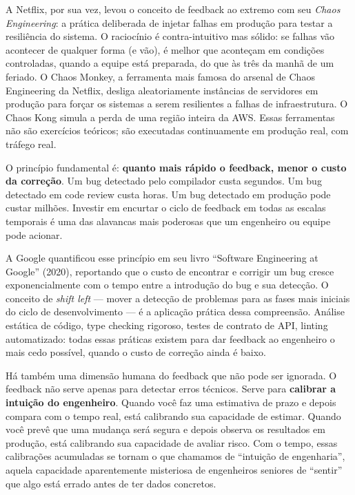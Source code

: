A Netflix, por sua vez, levou o conceito de feedback ao extremo com seu
\emph{Chaos Engineering}: a prática deliberada de injetar falhas em
produção para testar a resiliência do sistema. O raciocínio é
contra-intuitivo mas sólido: se falhas vão acontecer de qualquer forma
(e vão), é melhor que aconteçam em condições controladas, quando a equipe
está preparada, do que às três da manhã de um feriado. O Chaos Monkey, a
ferramenta mais famosa do arsenal de Chaos Engineering da Netflix, desliga
aleatoriamente instâncias de servidores em produção para forçar os
sistemas a serem resilientes a falhas de infraestrutura. O Chaos Kong
simula a perda de uma região inteira da AWS. Essas ferramentas não são
exercícios teóricos; são executadas continuamente em produção real,
com tráfego real.

O princípio fundamental é: \textbf{quanto mais rápido o feedback, menor
o custo da correção}. Um bug detectado pelo compilador custa segundos.
Um bug detectado em code review custa horas. Um bug detectado em produção
pode custar milhões. Investir em encurtar o ciclo de feedback em todas as
escalas temporais é uma das alavancas mais poderosas que um engenheiro
ou equipe pode acionar.

A Google quantificou esse princípio em seu livro ``Software Engineering
at Google'' (2020), reportando que o custo de encontrar e corrigir um
bug cresce exponencialmente com o tempo entre a introdução do bug e sua
detecção. O conceito de \emph{shift left} --- mover a detecção de
problemas para as fases mais iniciais do ciclo de desenvolvimento --- é
a aplicação prática dessa compreensão. Análise estática de código, type
checking rigoroso, testes de contrato de API, linting automatizado:
todas essas práticas existem para dar feedback ao engenheiro o mais cedo
possível, quando o custo de correção ainda é baixo.

Há também uma dimensão humana do feedback que não pode ser ignorada. O
feedback não serve apenas para detectar erros técnicos. Serve para
\textbf{calibrar a intuição do engenheiro}. Quando você faz uma
estimativa de prazo e depois compara com o tempo real, está calibrando
sua capacidade de estimar. Quando você prevê que uma mudança será segura
e depois observa os resultados em produção, está calibrando sua
capacidade de avaliar risco. Com o tempo, essas calibrações acumuladas
se tornam o que chamamos de ``intuição de engenharia'', aquela
capacidade aparentemente misteriosa de engenheiros seniores de ``sentir''
que algo está errado antes de ter dados concretos.

